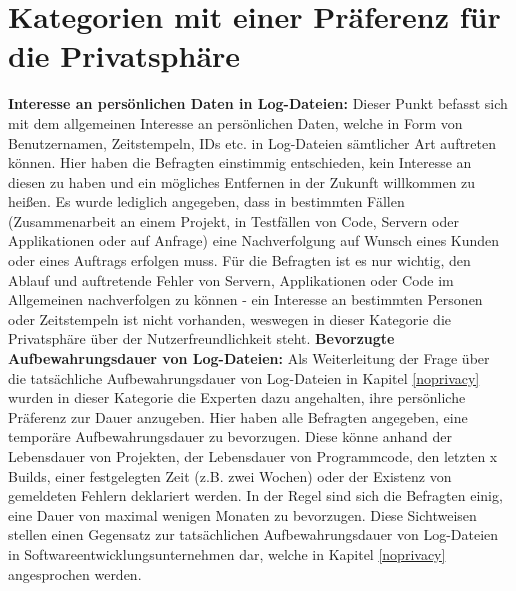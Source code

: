 \section{Kategorien mit einer Präferenz für die Privatsphäre} \label{privacy}
\textbf{Interesse an persönlichen Daten in Log-Dateien:} \newline
Dieser Punkt befasst sich mit dem allgemeinen Interesse an persönlichen Daten, welche in Form von Benutzernamen, Zeitstempeln, IDs etc. in Log-Dateien sämtlicher Art auftreten können. Hier haben die Befragten einstimmig
entschieden, kein Interesse an diesen zu haben und ein mögliches Entfernen in der Zukunft willkommen zu heißen. Es wurde lediglich angegeben, dass in bestimmten Fällen (Zusammenarbeit an einem Projekt, 
in Testfällen von Code, Servern oder Applikationen oder auf Anfrage) eine Nachverfolgung auf Wunsch eines Kunden oder eines Auftrags erfolgen muss. Für die Befragten ist es nur wichtig, den Ablauf und auftretende Fehler 
von Servern, Applikationen oder Code im Allgemeinen nachverfolgen zu können - ein Interesse an bestimmten Personen oder Zeitstempeln ist nicht vorhanden, weswegen in dieser Kategorie die Privatsphäre über der Nutzerfreundlichkeit
steht. \newline \newline
\textbf{Bevorzugte Aufbewahrungsdauer von Log-Dateien:} \newline
Als Weiterleitung der Frage über die tatsächliche Aufbewahrungsdauer von Log-Dateien in Kapitel \ref{noprivacy} wurden in dieser Kategorie die Experten dazu angehalten, ihre persönliche Präferenz zur Dauer anzugeben. Hier haben alle 
Befragten angegeben, eine temporäre Aufbewahrungsdauer zu bevorzugen. Diese könne anhand der Lebensdauer von Projekten, der Lebensdauer von Programmcode, den letzten x Builds, einer festgelegten Zeit (z.B. zwei Wochen)
oder der Existenz von gemeldeten Fehlern deklariert werden. In der Regel sind sich die Befragten einig, eine Dauer von maximal wenigen Monaten zu bevorzugen. Diese Sichtweisen stellen einen Gegensatz zur tatsächlichen Aufbewahrungsdauer von
Log-Dateien in Softwareentwicklungsunternehmen dar, welche in Kapitel \ref{noprivacy} angesprochen werden.


